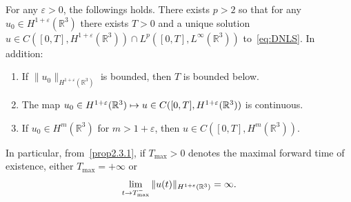 \documentclass[10pt]{amsart}
\theoremstyle{definition}\newtheorem{defi}[theo]{Definition}\newtheorem{rema}[theo]{Remark}\newtheorem{exam}[theo]{Example}\newtheorem{exem}[theo]{Example}\newtheorem{nota}[theo]{Notation}
\newcommand*\R{\mathbb{R}}
\newcommand*\eps{\varepsilon}
\renewcommand*{\to}{\mathchoice{\longrightarrow}{\rightarrow}{\rightarrow}{\rightarrow}}
\let\oldmapsto\mapsto
\renewcommand*{\mapsto}{\mathchoice{\longmapsto}{\oldmapsto}{\oldmapsto}{\oldmapsto}}
\begin{document}
\begin{prop}\label{prpLocExsCubic}
For any $\eps >0$, the followings holds.
There exists $p>2$ so that for any $u_0 \in H^{1+\eps} (\R^3)$ there exists $T>0$ and a unique solution $u \in C([0,T],H^{1 + \eps}(\R^3)) \cap L^p([0, T], L^\infty(\R^3))$ to~\eqref{eq:DNLS}. In addition:
\begin{enumerate}
\item\label{prop2.3.1} If $\| u_0 \|_{H^{1+\eps}(\R^3)}$ is bounded, then $T$ is bounded below.
\item\label{prop2.3.2} The map $u_0 \in H^{1+\eps}(\R^3) \mapsto u \in C([0,T],H^{1+\eps}(\R^3))$ is continuous.
\item\label{prop2.3.3} If $u_0 \in H^m(\R^3)$ for $m>{1+\eps}$, then $u \in C([0, T], H^m(\R^3))$.
\end{enumerate}
In particular, from~\eqref{prop2.3.1}, if $T_{\max} >0$ denotes the maximal forward time of existence, either $T_{\max} = +\infty$ or
\begin{equation}\label{eqBUAlt}
\lim_{t \to T_{\max}^-}\| u (t) \|_{H^{{1+\eps}}(\R^3)} = \infty.
\end{equation}
\end{prop}
\end{document}
